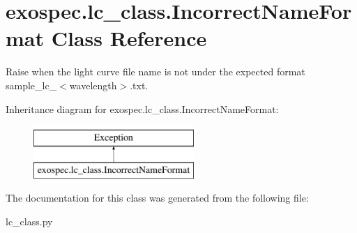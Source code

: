 \hypertarget{classexospec_1_1lc__class_1_1_incorrect_name_format}{}\section{exospec.\+lc\+\_\+class.\+Incorrect\+Name\+Format Class Reference}
\label{classexospec_1_1lc__class_1_1_incorrect_name_format}


Raise when the light curve file name is not under the expected format sample\+\_\+lc\+\_\+$<$wavelength$>$.\+txt.  


Inheritance diagram for exospec.\+lc\+\_\+class.\+Incorrect\+Name\+Format\+:\begin{figure}[H]
\begin{center}
\leavevmode
\includegraphics[height=2.000000cm]{classexospec_1_1lc__class_1_1_incorrect_name_format}
\end{center}
\end{figure}


The documentation for this class was generated from the following file\+:\begin{DoxyCompactItemize}
\item 
lc\+\_\+class.\+py\end{DoxyCompactItemize}
